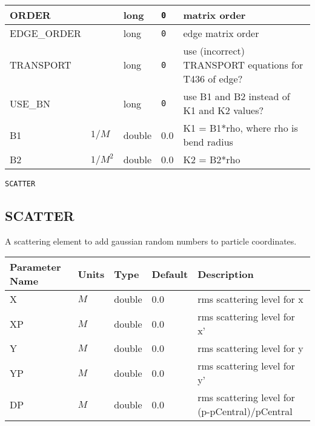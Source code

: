 \begin{tabular}{|l|l|l|l|p{\descwidth}|}
ORDER &  & long &  \verb|0| & matrix order  \\ \hline 
EDGE\_ORDER &  & long &  \verb|0| & edge matrix order  \\ \hline 
TRANSPORT &  & long &  \verb|0| & use (incorrect) TRANSPORT equations for T436 of edge?  \\ \hline 
USE\_BN &  & long &  \verb|0| & use B1 and B2 instead of K1 and K2 values?  \\ \hline 
B1 & $1/M$ & double &  0.0 & K1 = B1*rho, where rho is bend radius  \\ \hline 
B2 & $1/M^{2}$ & double &  0.0 & K2 = B2*rho  \\ \hline 
\end{tabular}

\begin{latexonly}
\newpage
\begin{center}{\Large\verb|SCATTER|}\end{center}
\end{latexonly}\subsection{SCATTER}
A scattering element to add gaussian random numbers to particle coordinates.
\\
\begin{tabular}{|l|l|l|l|p{\descwidth}|} \hline
Parameter Name & Units & Type & Default & Description \\ \hline 
X & $M$ & double &  0.0 & rms scattering level for x  \\ \hline 
XP & $M$ & double &  0.0 & rms scattering level for x'  \\ \hline 
Y & $M$ & double &  0.0 & rms scattering level for y  \\ \hline 
YP & $M$ & double &  0.0 & rms scattering level for y'  \\ \hline 
DP & $M$ & double &  0.0 & rms scattering level for (p-pCentral)/pCentral  \\ \hline 
\end{tabular}

